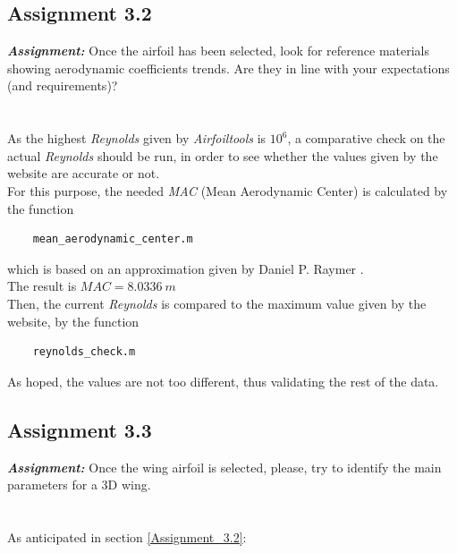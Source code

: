 \documentclass{article}
\begin{document}
\subsection{Assignment 3.2\label{Assignment_3.2}}

\textbf{\textit{Assignment:}} Once the airfoil has been selected, look for reference materials
showing aerodynamic coefficients trends. 
Are they in line with your expectations (and requirements)? \\ \\ \\ 

As the highest \textit{Reynolds} given by \textit{Airfoiltools} is $10^6$, a comparative check on the 
actual \textit{Reynolds} should be run, in order to see whether the values given by the website are 
accurate or not.\\ 
For this purpose, the needed \textit{MAC} (Mean Aerodynamic Center) is calculated by the 
function \autocite{Airbus_replacement_repo}
\begin{verbatim}
    mean_aerodynamic_center.m
\end{verbatim}
which is based on an approximation given by Daniel P. Raymer \autocite{Raymer_Daniel}. \\

The result is $MAC = 8.0336 \ m$ \\ 

Then, the current \textit{Reynolds} is compared to the maximum value given by the website, by the function

\begin{verbatim}
    reynolds_check.m
\end{verbatim}

As hoped, the values are not too different, thus validating the rest of the data.\\ 

\clearpage

\subsection{Assignment 3.3\label{Assignment_3.3}}

\textbf{\textit{Assignment:}} Once the wing airfoil is selected, please, 
try to identify the main parameters for a 3D wing. \\ \\ \\ 

As anticipated in section \ref{Assignment_3.2}: 
\end{document}
